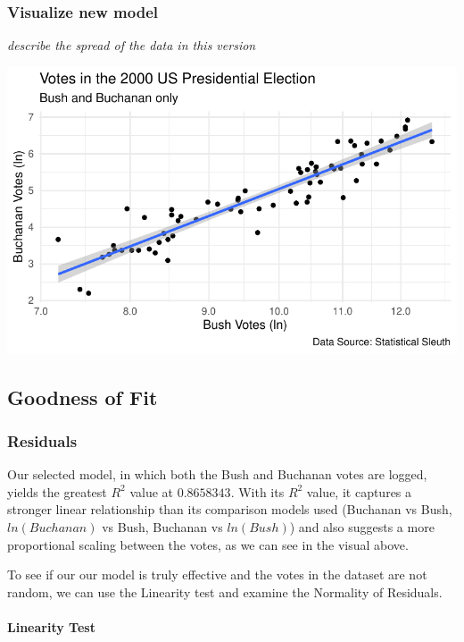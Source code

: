 \documentclass[
  letterpaper,
  DIV=11,
  numbers=noendperiod]{scrartcl}
\let\oldparagraph\paragraph
\renewcommand{\paragraph}[1]{\oldparagraph{#1}\mbox{}}
\begin{document}
\hypertarget{visualize-new-model}{%
\subsubsection{Visualize new model}\label{visualize-new-model}}

\emph{describe the spread of the data in this version}

\includegraphics{sds-291_s-24_case-study-template_files/figure-pdf/unnamed-chunk-6-1.pdf}

\hypertarget{goodness-of-fit}{%
\subsection{Goodness of Fit}\label{goodness-of-fit}}

\hypertarget{residuals}{%
\subsubsection{Residuals}\label{residuals}}

Our selected model, in which both the Bush and Buchanan votes are
logged, yields the greatest \(R^2\) value at \(0.8658343\). With its
\(R^2\) value, it captures a stronger linear relationship than its
comparison models used (Buchanan vs Bush, \(ln(Buchanan)\) vs Bush,
Buchanan vs \(ln(Bush)\)) and also suggests a more proportional scaling
between the votes, as we can see in the visual above.

To see if our our model is truly effective and the votes in the dataset
are not random, we can use the Linearity test and examine the Normality
of Residuals.

\hypertarget{linearity-test}{%
\paragraph{Linearity Test}\label{linearity-test}}
\end{document}
